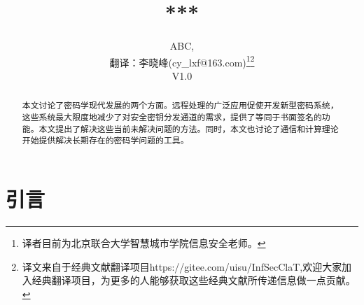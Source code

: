 \documentclass[]{article}
\title{***}
\author{ABC, \\
{\small  翻译：李晓峰(cy\_lxf@163.com)}\footnote{译者目前为北京联合大学智慧城市学院信息安全老师。}\footnote{译文来自于经典文献翻译项目https://gitee.com/uisu/InfSecClaT,欢迎大家加入经典翻译项目，为更多的人能够获取这些经典文献所传递信息做一点贡献。}\\
{\small  V1.0}
}
\begin{document}
	
	\maketitle
	
	\begin{abstract}
		本文讨论了密码学现代发展的两个方面。远程处理的广泛应用促使开发新型密码系统，这些系统最大限度地减少了对安全密钥分发通道的需求，提供了等同于书面签名的功能。本文提出了解决这些当前未解决问题的方法。同时，本文也讨论了通信和计算理论开始提供解决长期存在的密码学问题的工具。
	\end{abstract}

	\section{引言}
	
	
	
	
	
\end{document}
